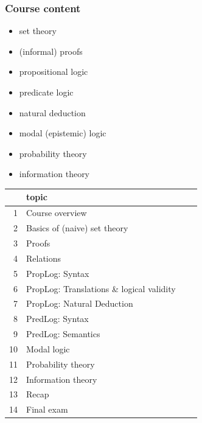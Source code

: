 \documentclass[fleqn,10pt,serif,xcolor=svgnames,xcolor=table,aspectratio=169,handout]{beamer}
\begin{document}
\begin{frame}
  \frametitle{Course content}

  \begin{minipage}{0.32\linewidth}

    \begin{itemize}
      \item set theory
      \item (informal) proofs
      \item propositional logic
      \item predicate logic
      \item natural deduction
      \item modal (epistemic) logic
      \item probability theory
      \item information theory
    \end{itemize}
  \end{minipage}
  \hfill
  \begin{minipage}{0.67\linewidth}
    \begin{tabular}{rlll}
          & topic\\ \midrule
      1   & Course overview \      \\%
      2   & Basics of (naive) set theory\\
      3   & Proofs\\
      4   & Relations \            \\%
      5   & PropLog: Syntax \      \\%
      6   & PropLog: Translations \& logical validity\\
      7   & PropLog: Natural Deduction\\
      8   & PredLog: Syntax \      \\%
      9   & PredLog: Semantics \   \\%
      10  & Modal logic\\
      11  & Probability theory\\
      12  & Information theory\\
      13  & Recap\\
      14  & Final exam\\
    \end{tabular}
  \end{minipage}
\end{frame}
\end{document}
